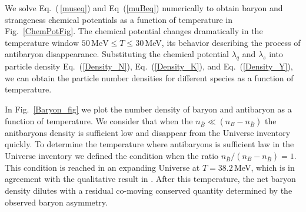

We solve Eq.~(\,\ref{museq}) and Eq~(\ref{muBeq}) numerically to obtain baryon and strangeness chemical potentials as a function of temperature in Fig.~\ref{ChemPotFig}. The chemical potential changes dramatically in the temperature window $50\,\mathrm{MeV}\le T\le 30$\,MeV, its behavior describing the process of antibaryon disappearance. Substituting the chemical potential $\lambda_q$ and $\lambda_s$ into particle density Eq.~(\ref{Density_N}), Eq.~(\ref{Density_K}), and Eq.~(\ref{Density_Y}), we can obtain the particle number densities for different species as a function of temperature.

In Fig.~\ref{Baryon_fig} we plot the number density of baryon and antibaryon as a function of temperature. We consider that when the  $n_{\overline B}\ll(n_B-n_{\overline B})$ the anitbaryons density is sufficient low and disappear from the Universe inventory quickly. To determine the temperature where antibaryons is sufficient law in the Universe inventory we defined the condition when the ratio $n_{\overline B}/(n_B-n_{\overline B})=1$. This condition is reached in an expanding Universe at $T=38.2$\,MeV, which is in agreement with the qualitative result in \cite{Kolb:1990vq}. After this temperature, the net baryon density dilutes with a residual co-moving conserved quantity determined by the observed baryon asymmetry.



